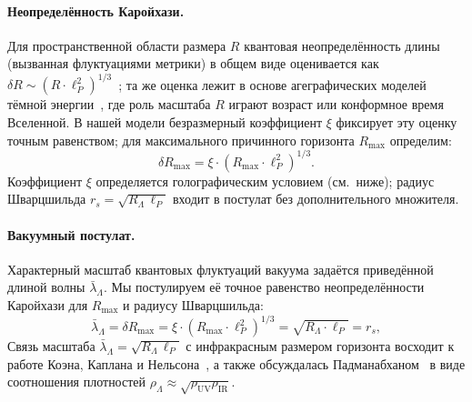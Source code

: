 \documentclass[12pt,a4paper]{article}
\begin{document}
\paragraph{Неопределённость Каройхази.} Для пространственной области размера $R$ квантовая неопределённость длины (вызванная флуктуациями метрики) в общем виде оценивается как $\delta R \sim (R \cdot \ell_P^2)^{1/3}$~\cite{Karolyhazy1966,Maziashvili2007}; та же оценка лежит в основе агеграфических моделей тёмной энергии~\cite{Cai2007,WeiCai2008}, где роль масштаба $R$ играют возраст или конформное время Вселенной. В нашей модели безразмерный коэффициент $\xi$ фиксирует эту оценку точным равенством; для максимального причинного горизонта $R_{\max}$ определим:
\begin{equation}
\delta R_{\max} = \xi \cdot (R_{\max} \cdot \ell_P^2)^{1/3}.
\end{equation}
Коэффициент $\xi$ определяется голографическим условием (см.~ниже); радиус Шварцшильда $r_s = \sqrt{R_\Lambda\,\ell_P}$ входит в постулат без дополнительного множителя.

\paragraph{Вакуумный постулат.} Характерный масштаб квантовых флуктуаций вакуума задаётся приведённой длиной волны $\bar\lambda_\Lambda$. Мы постулируем её точное равенство неопределённости Каройхази для $R_{\max}$ и радиусу Шварцшильда:
\begin{equation}
\boxed{\bar\lambda_\Lambda = \delta R_{\max} = \xi \cdot (R_{\max} \cdot \ell_P^2)^{1/3} = \sqrt{R_\Lambda \cdot \ell_P} = r_s,}
\end{equation}
Связь масштаба $\bar\lambda_\Lambda = \sqrt{R_\Lambda\,\ell_P}$ с инфракрасным размером горизонта восходит к работе Коэна, Каплана и Нельсона~\cite{Cohen1999}, а также обсуждалась Падманабханом~\cite{Padmanabhan2005} в виде соотношения плотностей $\rho_\Lambda \approx \sqrt{\rho_{\mathrm{UV}}\rho_{\mathrm{IR}}}$.
\end{document}
